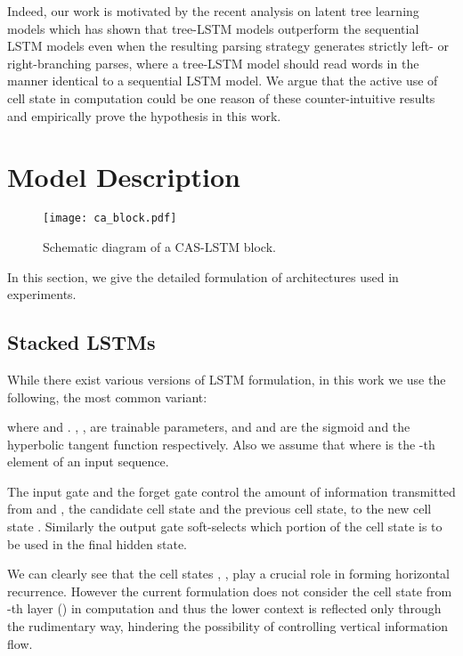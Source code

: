 \documentclass[wcp]{jmlr}
\begin{document}
    Indeed, our work is motivated by the recent analysis \citep{williams2018do,shi2018ontree} on latent tree learning models \citep{yogatama2017learning,choi2018learning} which has shown that tree-LSTM models outperform the sequential LSTM models even when the resulting parsing strategy generates strictly left- or right-branching parses, where a tree-LSTM model should read words in the manner identical to a sequential LSTM model.
    We argue that the active use of cell state in computation could be one reason of these counter-intuitive results and empirically prove the hypothesis in this work.
    
    
    \section{Model Description}
    \label{sec:caslstm}
    
    \begin{figure}[tb]
        \centering
        \texttt{[image: ca\_block.pdf]}
        \caption{Schematic diagram of a CAS-LSTM block.}
        \label{fig:diagram}
    \end{figure}
    
    In this section, we give the detailed formulation of architectures used in experiments.
    \subsection{Stacked LSTMs}
    \label{ssec:stacked-lstm}
    While there exist various versions of LSTM formulation, in this work we use the following, the most common variant:
    
    where  and . , ,  are trainable parameters,
    and  and  are the sigmoid and the hyperbolic tangent function respectively.
    Also we assume that  where  is the -th element of an input sequence.
    
    The input gate  and the forget gate  control the amount of information transmitted from  and , the candidate cell state and the previous cell state, to the new cell state .
    Similarly the output gate  soft-selects which portion of the cell state  is to be used in the final hidden state.
    
    We can clearly see that the cell states , ,  play a crucial role in forming horizontal recurrence.
    However the current formulation does not consider the cell state from -th layer () in computation and thus the lower context is reflected only through the rudimentary way, hindering the possibility of controlling vertical information flow.
    
\end{document}
